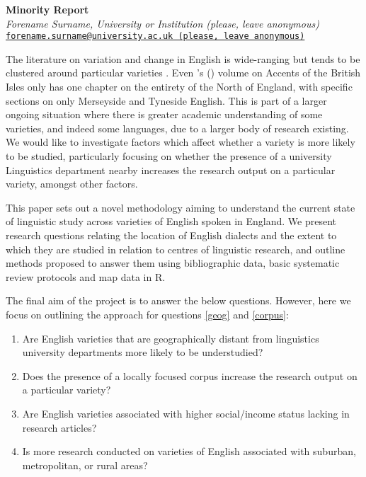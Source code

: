 \documentclass[12pt,a4paper]{article}
\newcommand\email[1]{{\tt\href{mailto:#1}{#1}}} %
\newcommand{\citeposs}[1]{\citeauthor{#1}'s (\citeyear{#1})}
\begin{document}
	\raggedbottom
	\begin{center}
		\textbf{Minority Report}\\
		\vspace{0.5em}
		\textit{Forename Surname, University or Institution (please, leave anonymous)}\\
		\vspace{0.25em}
		\email{forename.surname@university.ac.uk (please, leave anonymous)}
	\end{center}
	
	The literature on variation and change in English is wide-ranging but tends to be clustered around particular varieties \citep{Trudgill2002}. Even \citeposs{Wells1982b} volume on Accents of the British Isles only has one chapter on the entirety of the North of England, with specific sections on only Merseyside and Tyneside English. This is part of a larger ongoing situation where there is greater academic understanding of some varieties, and indeed some languages, due to a larger body of research existing. We would like to investigate factors which affect whether a variety is more likely to be studied, particularly focusing on whether the presence of a university Linguistics department nearby increases the research output on a particular variety, amongst other factors.
	
	This paper sets out a novel methodology aiming to understand the current state of linguistic study across varieties of English spoken in England. We present research questions relating the location of English dialects and the extent to which they are studied in relation to centres of linguistic research, and outline methods proposed to answer them using bibliographic data, basic systematic review protocols and map data in R. 
	
	The final aim of the project is to answer the below questions. However, here we focus on outlining the approach for questions \ref{geog} and \ref{corpus}:
	\begin{enumerate} 
		\item Are English varieties that are geographically distant from linguistics university departments more likely to be understudied? \label{geog}
		
		\item Does the presence of a locally focused corpus increase the research output on a particular variety?  \label{corpus}
		
		\item Are English varieties associated with higher social/income status lacking in research articles? \label{income}
		
		\item Is more research conducted on varieties of English associated with suburban, metropolitan, or rural areas? \label{suburban}
	\end{enumerate}
\end{document}
